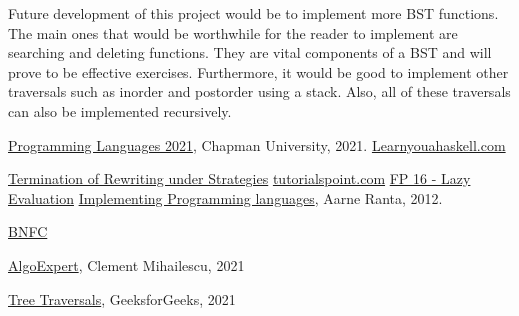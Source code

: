 \documentclass{article}
\begin{document}
\medskip\noindent
Future development of this project would be to implement more BST functions. The main ones that would be worthwhile for the reader to implement are searching and deleting functions. They are vital components of a BST and will prove to be effective exercises. Furthermore, it would be good to implement other traversals such as inorder and postorder using a stack. Also, all of these traversals can also be implemented recursively. 

\begin{thebibliography}{99}
 \href{https://github.com/alexhkurz/programming-languages-2021/blob/main/README.md}{Programming Languages 2021}, Chapman University, 2021.
 \href{http://learnyouahaskell.com/chapters}{Learnyouahaskell.com}

\href{https://members.loria.fr/IGnaedig/wp-content/blogs.dir/95/files/sites/95/2018/11/version-preli-tocl.pdf}{Termination of Rewriting under Strategies}
 \href{https://www.tutorialspoint.com/haskell/haskell_types_and_type_class.htm}{tutorialspoint.com}
 \href{https://www.youtube.com/watch?v=R1uBhRK2AKI}{FP 16 - Lazy Evaluation}
 \href{http://www.grammaticalframework.org/ipl-book/}{Implementing Programming languages}, Aarne Ranta, 2012.

 \href{https://bnfc.readthedocs.io/en/latest/lbnf.html} {BNFC}

\href{https://www.algoexpert.io/product}{AlgoExpert}, Clement Mihailescu, 2021

\href{https://www.geeksforgeeks.org/tree-traversals-inorder-preorder-and-postorder/}{Tree Traversals}, GeeksforGeeks, 2021
\end{thebibliography}
\end{document}
